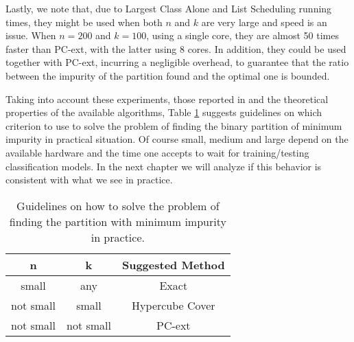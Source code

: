 Lastly, we note that, due to Largest Class Alone and List Scheduling running times, they might be used when both $n$ and $k$ are very large and speed is an  issue. When $n=200$ and $k=100$, using a single core, they are almost 50 times faster than PC-ext, with the latter using 8 cores. In addition, they could be  used together with PC-ext, incurring a negligible overhead, to guarantee that the ratio between the impurity of the partition found and the optimal one is bounded.

 
Taking into account these  experiments, those reported in \cite{journals/datamine/CoppersmithHH99} and the  theoretical properties of the available algorithms, Table \ref{tab:guidelines}  suggests  guidelines on which criterion to use to solve the problem of finding the binary partition of minimum impurity in practical situation. Of course small, medium and large depend on the available hardware and the time one accepts to wait for training/testing classification models. In the next chapter we will analyze if this behavior is consistent with what we see in practice.


\begin{table}[htb]
\centering
\begin{tabular}{c|c|c}
{\bf n}    & {\bf k}   & {\bf Suggested Method} \\ \hline 
small      & any       &  Exact \\
not small  & small     &  Hypercube Cover \\
not small  & not small &  PC-ext \\
\end{tabular}
\caption{Guidelines on how to solve the problem of finding the partition with minimum impurity in practice.}
\label{tab:guidelines}
\end{table}


